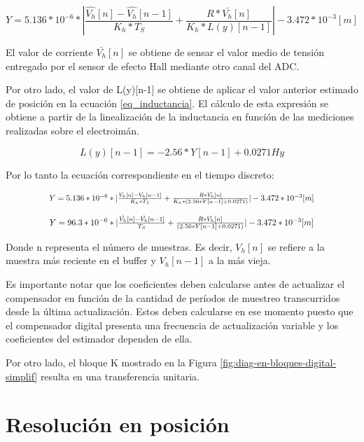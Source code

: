 \begin{equation}
	Y = 5.136*10^{-6}*|\frac{\hat{V_h}[n]-\hat{V_h}[n-1]}{K_h*T_S} + \frac{R*\bar{V_h}[n]}{K_h*L(y)[n-1]}|-3.472*10^{-3}[m]
\end{equation}

\noindent El valor de corriente $\bar{V_h}[n]$ se obtiene de sensar el valor medio de tensión entregado por el sensor de efecto Hall mediante otro canal del ADC.

\noindent Por otro lado, el valor de L(y)[n-1] se obtiene de aplicar el valor anterior estimado de posición en la ecuación \ref{eq_inductancia}. El cálculo de esta expresión se obtiene a partir de la linealización de la inductancia en función de las mediciones realizadas sobre el electroimán.

\begin{equation} \label{eq_inductancia}
	L(y)[n-1] = -2.56*Y[n-1]+0.0271 Hy
\end{equation}

\noindent Por lo tanto la ecuación correspondiente en el tiempo discreto:

\begin{equation}
	\resizebox{.8\hsize}{!}
	{
	$Y = 5.136*10^{-6}*|\frac{\hat{V_h}[n]-\hat{V_h}[n-1]}{K_h*T_S} + \frac{R*\bar{V_h}[n]}{K_h*(2.56*Y[n-1]+0.0271)}|-3.472*10^{-3}[m]$
	}
\end{equation}

\begin{equation}
	\resizebox{.8\hsize}{!}
	{
	$
	Y = 96.3*10^{-6}*|\frac{\hat{V_h}[n]-\hat{V_h}[n-1]}{T_S} + \frac{R*\bar{V_h}[n]}{(2.56*Y[n-1]+0.0271)}|-3.472*10^{-3}[m]
	$
	}
\end{equation}


\noindent Donde n representa el número de muestras. Es decir, $V_h[n]$ se refiere a la muestra más reciente en el buffer y $V_h[n-1]$ a la más vieja.

\noindent Es importante notar que los coeficientes deben calcularse antes de actualizar el compensador en función de la cantidad de períodos de muestreo transcurridos desde la última actualización. Estos deben calcularse en ese momento puesto que el compensador digital presenta una frecuencia de actualización variable y los coeficientes del estimador dependen de ella.

\noindent Por otro lado, el bloque K mostrado en la Figura \ref{fig:diag-en-bloques-digital-simplif} resulta en una transferencia unitaria.

\section{Resolución en posición}

